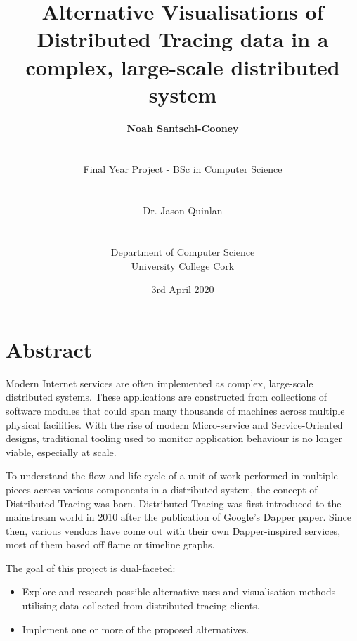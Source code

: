\documentclass[12pt,pdftex,titlepage]{report}
\author{\textbf{Noah Santschi-Cooney}
\\\\\\\small{Final Year Project - BSc in Computer Science}
\\\\\\\small{Dr. Jason Quinlan}
\\\\\\\small{Department of Computer Science}
\\\small{University College Cork}}
\title{\textbf{Alternative Visualisations of Distributed Tracing data in a complex, large-scale distributed system}}
\date{\vfill\small{3rd April 2020}}
\begin{document}
    \maketitle    

    \chapter*{Abstract}
        Modern Internet services are often implemented as complex, large-scale distributed systems. These applications are constructed from collections 
        of software modules that could span many thousands of machines across multiple physical facilities. With the rise of modern Micro-service and 
        Service-Oriented designs, traditional tooling used to monitor application behaviour is no longer viable, especially at scale. 
        
        To understand the flow and life cycle of a unit of work performed in multiple pieces across various components in a distributed system, the concept of 
        Distributed Tracing was born. Distributed Tracing was first introduced to the mainstream world in 2010 after the publication of Google’s Dapper
        paper. Since then, various vendors have come out with their own Dapper-inspired services, most of them based off flame or timeline graphs. 
        
        The goal of this project is dual-faceted:
        \begin{itemize}
            \item Explore and research possible alternative uses and visualisation methods utilising data collected from distributed tracing clients.
            \item Implement one or more of the proposed alternatives.
        \end{itemize}
\end{document}
